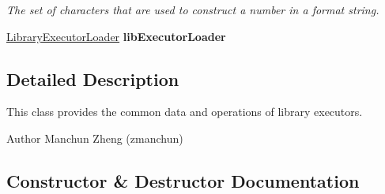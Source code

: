 \begin{DoxyCompactItemize}
\begin{DoxyCompactList}\small\item\em The set of characters that are used to construct a number in a format string. \end{DoxyCompactList}\item 
\hypertarget{classedu_1_1udel_1_1cis_1_1vsl_1_1civl_1_1library_1_1common_1_1BaseLibraryExecutor_a82c22ad84478bb7575cd2b1d4bfa973c}{}\hyperlink{interfaceedu_1_1udel_1_1cis_1_1vsl_1_1civl_1_1semantics_1_1IF_1_1LibraryExecutorLoader}{Library\+Executor\+Loader} {\bfseries lib\+Executor\+Loader}\label{classedu_1_1udel_1_1cis_1_1vsl_1_1civl_1_1library_1_1common_1_1BaseLibraryExecutor_a82c22ad84478bb7575cd2b1d4bfa973c}

\end{DoxyCompactItemize}


\subsection{Detailed Description}
This class provides the common data and operations of library executors. 

\begin{DoxyAuthor}{Author}
Manchun Zheng (zmanchun) 
\end{DoxyAuthor}


\subsection{Constructor \& Destructor Documentation}
\hypertarget{classedu_1_1udel_1_1cis_1_1vsl_1_1civl_1_1library_1_1common_1_1BaseLibraryExecutor_a59a60ccf84169b74f9c2457490b54697}{}
